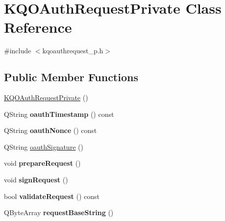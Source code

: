 \hypertarget{class_k_q_o_auth_request_private}{}\section{K\+Q\+O\+Auth\+Request\+Private Class Reference}
\label{class_k_q_o_auth_request_private}


{\ttfamily \#include $<$kqoauthrequest\+\_\+p.\+h$>$}

\subsection*{Public Member Functions}
\begin{DoxyCompactItemize}
\item 
\hyperlink{class_k_q_o_auth_request_private_ad08700bda77011aa5352e02423c5b202}{K\+Q\+O\+Auth\+Request\+Private} ()
\item 
\mbox{\label{class_k_q_o_auth_request_private_a49737ea75440ee7ac599b3139f79c7b9}} 
Q\+String {\bfseries oauth\+Timestamp} () const
\item 
\mbox{\label{class_k_q_o_auth_request_private_a82e51666cec15751b0acdfe5ff5c739d}} 
Q\+String {\bfseries oauth\+Nonce} () const
\item 
Q\+String \hyperlink{class_k_q_o_auth_request_private_a8e6c6a907d86eec00365e3ef40a33e9e}{oauth\+Signature} ()
\item 
\mbox{\label{class_k_q_o_auth_request_private_af831304684672d963d7098c608c310dd}} 
void {\bfseries prepare\+Request} ()
\item 
\mbox{\label{class_k_q_o_auth_request_private_afd01ae1a996e5b82e1f344c8abe89ab1}} 
void {\bfseries sign\+Request} ()
\item 
\mbox{\label{class_k_q_o_auth_request_private_acfde4864fbbf5f0e1816df5a2427ca3c}} 
bool {\bfseries validate\+Request} () const
\item 
\mbox{\label{class_k_q_o_auth_request_private_a7edc68adc02b6665c7776e810385e600}} 
Q\+Byte\+Array {\bfseries request\+Base\+String} ()

\end{DoxyCompactItemize}
